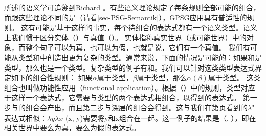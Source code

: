  所述的语义学可追溯到Richard  \citet{Montague74a-u}。有些语义理论规定了每条规则全部可能的组合，而跟这些理论不同的是（请看\ref{sec-PSG-Semantik}），GPSG应用具有普适性的规则。
这有可能是基于这样的事实，每个待组合的表达式都有一个语义类型。语义上我们惯于区分实体（）与真值（）。
实体指称真实世界（或可能世界）中的对象，而整个句子可以为真，也可以为假，也就是说，它们有一个真值。
我们有可能从类型和中创造出更为复杂的类型。通常来说，下面的情况是可能的：如果和是类型，那么也是一个类型。复杂类型的例子有和。我们可以针对这类类型表达式界定如下的组合性规则：
\ea
如果$\alpha$属于类型，$\beta$属于类型，那么$\alpha(\beta)$属于类型。
\z
这类组合也叫做功能性应用（functional application）。根据（）中的规则，类型对应于这样一个表达式，它需要与类型的两个表达式相组合，以得到的表达式。
  第一步与的组合会产出，而且第二步与深层的组合会得到。这与我们在第\pageref{lambda-moegen}页看到的$\lambda$"=表达式相似：$\lambda y \lambda x$ (x, y)需要将y和x组合在一起。这一例子的结果是（, ），即在相关世界中要么为真，要么为假的表达式。
